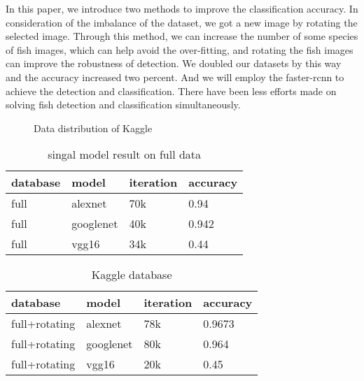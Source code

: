 \documentclass[conference]{IEEEtran}
\begin{document}
In this paper, we introduce two methods to improve the classification accuracy. In consideration of the imbalance of the dataset, we got a new image by rotating the selected image. Through this method, we can increase the number of some species of fish images, which can help avoid the over-fitting, and rotating the fish images can improve the robustness of detection. We doubled our datasets by this way and the accuracy increased two percent. And we will employ the faster-rcnn to achieve the detection and classification. There have been less efforts made on solving fish detection and classification simultaneously\cite{qin2015deepfish}. \par

\begin{figure}[!ht]
  
\centering
{}
  \hspace{0.05in}
  \hspace{0.05in}
  \caption{Data distribution of Kaggle}
  \label{fig:data}

\end{figure}


\begin{table}[t]
  \caption{singal model result on full data}
  \label{table:table2}
  \centering
  \begin{tabular}{llll}
    \toprule
    \cmidrule{1-2}
    database     &model     &iteration   &accuracy \\
    \midrule
    full & alexnet  & 70k  & 0.94 \\
    full & googlenet &40k  &0.942 \\
    full  & vgg16 & 34k & 0.44 \\
    \bottomrule
  \end{tabular}
\end{table}


\begin{table}[!ht]
\small
\centering
\caption{Kaggle database}
\label{table:table3}
\begin{tabular}{llll}
    \toprule
    \cmidrule{1-2}
     database     &model     &iteration   &accuracy \\
	\midrule
       full+rotating & alexnet   & 78k  & 0.9673  \\
       full+rotating & googlenet & 80k  &0.964    \\
       full+rotating  & vgg16 & 20k & 0.45  \\
       \bottomrule
\end{tabular}
\end{table}
\end{document}
